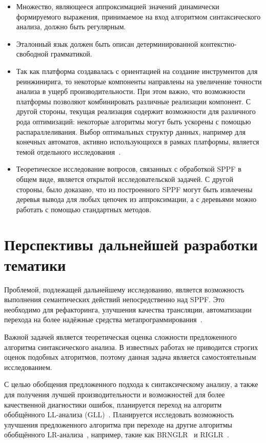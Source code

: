 \begin{itemize}
    \item Множество, являющееся аппроксимацией значений динамически формируемого выражения, принимаемое на вход алгоритмом синтаксического анализа, должно быть регулярным.
    \item Эталонный язык должен быть описан детерминированной контекстно-свободной грамматикой.
    \item Так как платформа создавалась с ориентацией на создание инструментов для реинжинирига, то некоторые компоненты направлены на увеличение точности анализа в ущерб производительности. 
    При этом важно, что возможности платформы позволяют комбинировать различные реализации компонент.
    С другой стороны, текущая реализация содержит возможности для различного рода оптимизаций: некоторые алгоритмы могут быть ускорены с помощью распараллеливания. Выбор оптимальных структур данных, например для конечных автоматов, активно использующихся в рамках платформы, является темой отдельного исследования~\cite{DataStructureForFA}.
    \item Теоретическое исследование вопросов, связанных с обработкой SPPF в общем виде, является открытой исследовательской задачей. С другой стороны, было доказано, что из построенного SPPF могут быть извлечены деревья вывода для любых цепочек из аппроксимации, а с деревьями можно работать с помощью стандартных методов. 
\end{itemize}

\section*{Перспективы дальнейшей разработки тематики}

Проблемой, подлежащей дальнейшему исследованию, является возможность выполнения семантических действий непосредственно над SPPF. Это необходимо для рефакторинга, улучшения качества трансляции, автоматизации перехода на более надёжные средства метапрограммирования~\cite{JSStagedMetaProgramming,JSStagedMetaProgrammingFull}.

Важной задачей является теоретическая оценка сложности предложенного алгоритма синтаксического анализа. В известных работах не приводится строгих оценок подобных алгоритмов, поэтому данная задача является самостоятельным исследованием.

С целью обобщения предложенного подхода к синтаксическому анализу, а также для получения лучшей производительности и возможностей для более качественной диагностики ошибок, планируется переход на алгоритм обобщённого LL-анализа (GLL)~\cite{GLL,AbstractGLL}. Планируется исследовать возможность улучшения предложенного алгоритма при переходе на другие алгоритмы обобщённого LR-анализа~\cite{GeneralisedlrBIG}, например, такие как BRNGLR~\cite{BRNGLR} и RIGLR~\cite{RIGLR}.


